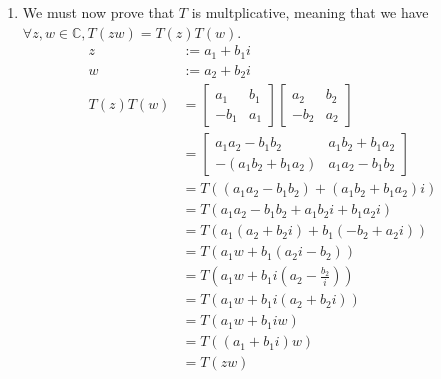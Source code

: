 \documentclass{article}
\newenvironment{answers}{ %
	\begin{enumerate}
		\setlength{\itemsep}{\bigskipamount}
}{\end{enumerate}}
\newcommand{\C}{\mathbb{C}}
\begin{document}
\begin{answers}
\begin{enumerate}
			\item
				We must now prove that \(T\) is multplicative, meaning that we have \(\forall z,w \in \C, T(zw) = T(z)T(w)\).
				\begin{align*}
					z        & := a_1 + b_1i \\
					w        & := a_2 + b_2i \\
					T(z)T(w) & = \left[ \begin{matrix} a_1 & b_1 \\ -b_1 & a_1 \end{matrix} \right]\left[ \begin{matrix} a_2 & b_2 \\ -b_2 & a_2 \end{matrix} \right] \\
					         & = \left[ \begin{matrix} a_1a_2-b_1b_2 & a_1b_2+b_1a_2 \\ -(a_1b_2+b_1a_2) & a_1a_2-b_1b_2 \end{matrix} \right] \\
					         & = T((a_1a_2-b_1b_2) + (a_1b_2+b_1a_2)i) \\
					         & = T(a_1a_2 - b_1b_2 + a_1b_2i + b_1a_2i) \\
					         & = T(a_1(a_2 + b_2i) + b_1(-b_2 + a_2i)) \\
					         & = T(a_1w + b_1(a_2i - b_2)) \\
					         & = T(a_1w + b_1i(a_2 - \frac{b_2}{i})) \\
					         & = T(a_1w + b_1i(a_2 + b_2i)) \\
					         & = T(a_1w + b_1iw) \\
					         & = T((a_1 + b_1i)w) \\
					         & = T(zw)
				\end{align*}
		\end{enumerate}
\end{answers}
\end{document}
